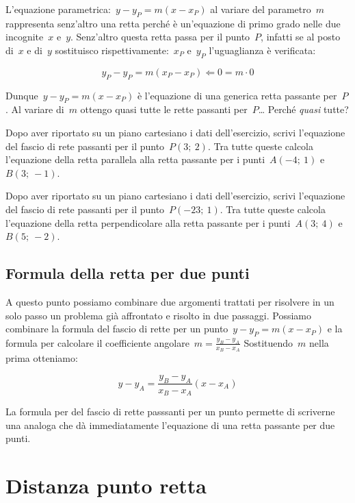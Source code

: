 L'equazione parametrica:~$y - y_P = m (x - x_P)$ al variare del parametro~$m$ 
rappresenta senz'altro una retta perché è un'equazione di primo grado nelle 
due incognite~$x$ e~$y$. Senz'altro questa retta passa per il punto~$P$, 
infatti se al posto di~$x$ e di~$y$ sostituisco 
rispettivamente:~$x_P$ e~$y_P$ l'uguaglianza è verificata:

\[y_P - y_P = m (x_P - x_P) \Leftarrow 0 = m \cdot 0\]

Dunque~$y - y_P = m (x - x_P)$ è l'equazione di una generica retta passante 
per~$P$. Al variare di~$m$ ottengo quasi tutte le rette passanti per~$P$\dots 
Perché \emph{quasi} tutte?

\begin{exrig}
 \begin{esempio}
  Dopo aver riportato su un piano cartesiano i dati dell'esercizio,
  scrivi l'equazione del fascio di rete passanti per il punto~$P(3;~2)$.
  Tra tutte queste calcola l'equazione della retta parallela alla retta 
  passante per i punti~$A(-4;~1)$ e~$B(3;~-1)$.
 \end{esempio}
 \begin{esempio}
  Dopo aver riportato su un piano cartesiano i dati dell'esercizio,
  scrivi l'equazione del fascio di rete passanti per il punto~$P(-23;~1)$.
  Tra tutte queste calcola l'equazione della retta perpendicolare alla retta 
  passante per i punti~$A(3;~4)$ e~$B(5;~-2)$.
 \end{esempio}
\end{exrig}

\subsection{Formula della retta per due punti}

A questo punto possiamo combinare due argomenti trattati per risolvere in un
solo passo un problema già affrontato e risolto in due passaggi. 
Possiamo combinare la formula del fascio di rette per un 
punto~$y - y_P = m (x - x_P)$
e la formula per calcolare il 
coefficiente angolare~$m = \frac{y_B - y_A}{x_B - x_A}$ 
Sostituendo~$m$ nella prima otteniamo:

$$y - y_A = \frac{y_B - y_A}{x_B - x_A} (x - x_A)$$

La formula per del fascio di rette passsanti per un punto permette di 
scriverne una analoga che dà immediatamente l'equazione di una retta passante 
per due punti.

\section{Distanza punto retta}
\label{sec:retta_distanzapuntoretta}

